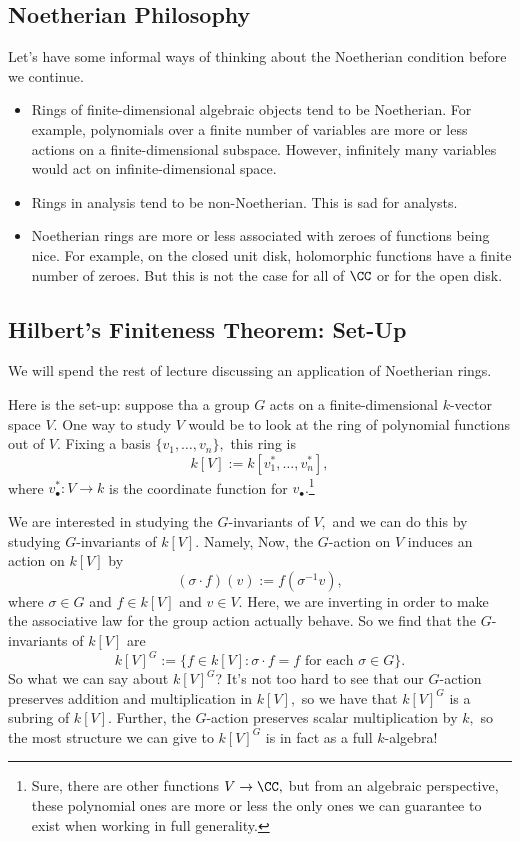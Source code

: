 \subsection{Noetherian Philosophy}
Let's have some informal ways of thinking about the Noetherian condition before we continue.
\begin{itemize}
	\item Rings of finite-dimensional algebraic objects tend to be Noetherian. For example, polynomials over a finite number of variables are more or less actions on a finite-dimensional subspace. However, infinitely many variables would act on infinite-dimensional space.
	\item Rings in analysis tend to be non-Noetherian. This is sad for analysts.
	\item Noetherian rings are more or less associated with zeroes of functions being nice. For example, on the closed unit disk, holomorphic functions have a finite number of zeroes. But this is not the case for all of $\CC$ or for the open disk.
\end{itemize}

\subsection{Hilbert's Finiteness Theorem: Set-Up}
We will spend the rest of lecture discussing an application of Noetherian rings.

Here is the set-up: suppose tha a group $G$ acts on a finite-dimensional $k$-vector space $V.$ One way to study $V$ would be to look at the ring of polynomial functions out of $V.$ Fixing a basis $\{v_1,\ldots,v_n\},$ this ring is
\[k[V]:=k[v_1^*,\ldots,v_n^*],\]
where $v_\bullet^*:V\to k$ is the coordinate function for $v_\bullet.$\footnote{Sure, there are other functions $V\to\CC,$ but from an algebraic perspective, these polynomial ones are more or less the only ones we can guarantee to exist when working in full generality.}

We are interested in studying the $G$-invariants of $V,$ and we can do this by studying $G$-invariants of $k[V].$ Namely,  Now, the $G$-action on $V$ induces an action on $k[V]$ by
\[(\sigma\cdot f)(v):=f(\sigma^{-1}v),\]
where $\sigma\in G$ and $f\in k[V]$ and $v\in V.$ Here, we are inverting in order to make the associative law for the group action actually behave. So we find that the $G$-invariants of $k[V]$ are
\[k[V]^G:=\{f\in k[V]:\sigma\cdot f=f\text{ for each }\sigma\in G\}.\]
So what we can say about $k[V]^G$? It's not too hard to see that our $G$-action preserves addition and multiplication in $k[V],$ so we have that $k[V]^G$ is a subring of $k[V].$ Further, the $G$-action preserves scalar multiplication by $k,$ so the most structure we can give to $k[V]^G$ is in fact as a full $k$-algebra!

